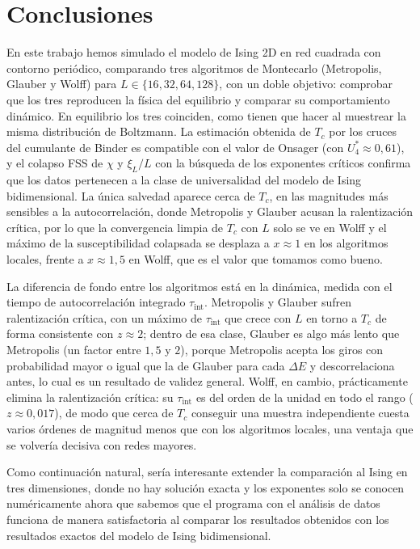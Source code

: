 \chapter{Conclusiones} \label{chap:conclusiones}

En este trabajo hemos simulado el modelo de Ising 2D en red cuadrada con contorno periódico, comparando tres algoritmos de Montecarlo (Metropolis, Glauber y Wolff) para $L\in\{16,32,64,128\}$, con un doble objetivo: comprobar que los tres reproducen la física del equilibrio y comparar su comportamiento dinámico. En equilibrio los tres coinciden, como tienen que hacer al muestrear la misma distribución de Boltzmann. La estimación obtenida de $T_c$ por los cruces del cumulante de Binder es compatible con el valor de Onsager (con $U_4^*\approx 0{,}61$), y el colapso FSS de $\chi$ y $\xi_L/L$ con la búsqueda de los exponentes críticos confirma que los datos pertenecen a la clase de universalidad del modelo de Ising bidimensional. La única salvedad aparece cerca de $T_c$, en las magnitudes más sensibles a la autocorrelación, donde Metropolis y Glauber acusan la ralentización crítica, por lo que la convergencia limpia de $T_c$ con $L$ solo se ve en Wolff y el máximo de la susceptibilidad colapsada se desplaza a $x\approx 1$ en los algoritmos locales, frente a $x\approx 1{,}5$ en Wolff, que es el valor que tomamos como bueno.

La diferencia de fondo entre los algoritmos está en la dinámica, medida con el tiempo de autocorrelación integrado $\tau_{\text{int}}$. Metropolis y Glauber sufren ralentización crítica, con un máximo de $\tau_{\text{int}}$ que crece con $L$ en torno a $T_c$ de forma consistente con $z\approx 2$; dentro de esa clase, Glauber es algo más lento que Metropolis (un factor entre $1{,}5$ y $2$), porque Metropolis acepta los giros con probabilidad mayor o igual que la de Glauber para cada $\Delta E$ y descorrelaciona antes, lo cual es un resultado de validez general. Wolff, en cambio, prácticamente elimina la ralentización crítica: su $\tau_{\text{int}}$ es del orden de la unidad en todo el rango ($z\approx 0{,}017$), de modo que cerca de $T_c$ conseguir una muestra independiente cuesta varios órdenes de magnitud menos que con los algoritmos locales, una ventaja que se volvería decisiva con redes mayores.

Como continuación natural, sería interesante extender la comparación al Ising en tres dimensiones, donde no hay solución exacta y los exponentes solo se conocen numéricamente ahora que sabemos que el programa con el análisis de datos funciona de manera satisfactoria al comparar los resultados obtenidos con los resultados exactos del modelo de Ising bidimensional.

